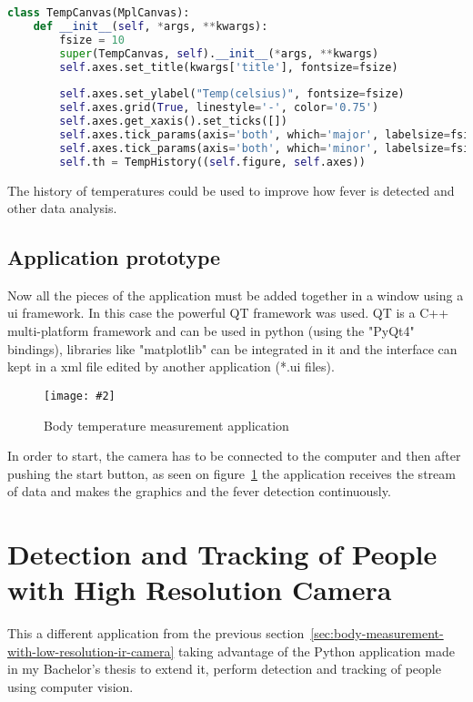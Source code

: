 \documentclass[hidelinks,11pt,a4paper,oneside,article]{memoir}
\newcommand{\putimage}[3][10] %
{
\begin{figure}[h]
    \centering
    \captionsetup{justification=centering}
    \texttt{[image: \#2]}
    \caption{#3}
    \label{fig:#2}
\end{figure}
}
\begin{document}
\begin{lstlisting}[label={listing:history},caption={Class to plot the graphic of temperatures},language=Python, style=styleprogramming]
class TempCanvas(MplCanvas):
    def __init__(self, *args, **kwargs):
        fsize = 10
        super(TempCanvas, self).__init__(*args, **kwargs)
        self.axes.set_title(kwargs['title'], fontsize=fsize)
        
        self.axes.set_ylabel("Temp(celsius)", fontsize=fsize)
        self.axes.grid(True, linestyle='-', color='0.75')
        self.axes.get_xaxis().set_ticks([])
        self.axes.tick_params(axis='both', which='major', labelsize=fsize - 2)
        self.axes.tick_params(axis='both', which='minor', labelsize=fsize - 2)
        self.th = TempHistory((self.figure, self.axes))
\end{lstlisting}

The history of temperatures could be used to improve how fever is detected and other data analysis.

\subsection{Application prototype}
Now all the pieces of the application must be added together in a window using a \gls{ui} framework. In this case the powerful QT framework was used. QT is a C++ multi-platform framework and can be used in python (using the "PyQt4" bindings), libraries like "matplotlib" can be integrated in it and the interface can kept in a xml file edited by another application (*.ui files).

\putimage[16]{monitor}{Body temperature measurement application}

In order to start, the camera has to be connected to the computer and then after pushing the start button, as seen on figure~\ref{fig:monitor} the application receives the stream of data and makes the graphics and the fever detection continuously.


\section{Detection and Tracking of People with High Resolution Camera}
This a different application from the previous section~\ref{sec:body-measurement-with-low-resolution-ir-camera} taking advantage of the Python application made in my Bachelor's thesis to extend it, perform detection and tracking of people using computer vision.
\end{document}
